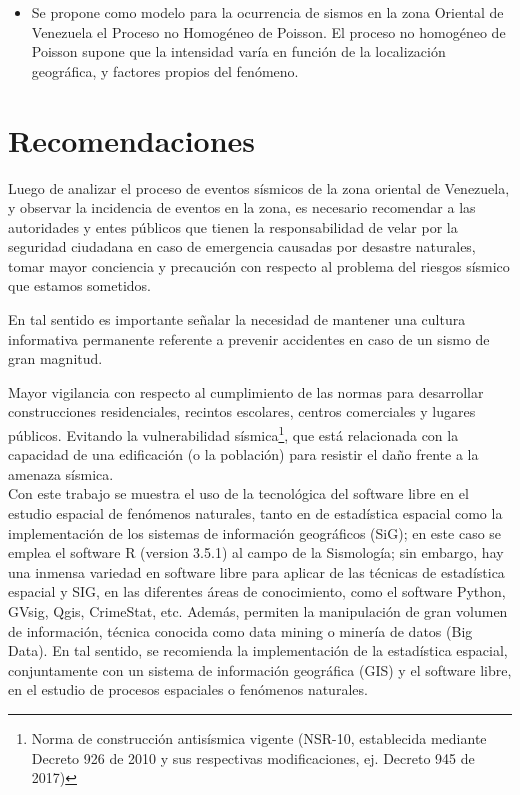 \documentclass[12pt]{report}
\begin{document}
{{{{{{{{{{{{{{{\begin{itemize}
 
 
 \item  Se propone como modelo para la ocurrencia de sismos en la zona Oriental de Venezuela el Proceso no Homogéneo de Poisson. 
  El proceso no homogéneo de Poisson supone que la intensidad varía en función de la localización geográfica, y factores propios del fenómeno. 
  
\end{itemize}

	\section{Recomendaciones }{\label{Recomendacion} }



   Luego de analizar el proceso de eventos sísmicos de la zona oriental de Venezuela, y observar la incidencia de eventos en la zona, es necesario recomendar a las autoridades  y entes públicos que tienen la responsabilidad de velar por la seguridad ciudadana en caso de emergencia causadas por desastre naturales, tomar mayor conciencia y precaución con respecto al problema del riesgos sísmico que estamos sometidos. 
 
   En tal sentido es importante señalar la necesidad de mantener una cultura informativa permanente referente a prevenir accidentes en caso de un sismo de gran magnitud.
 
  Mayor vigilancia  con respecto al  cumplimiento de las normas para desarrollar construcciones residenciales, recintos escolares, centros comerciales y lugares públicos. Evitando la vulnerabilidad sísmica{\footnote{\scriptsize  Norma de construcción antisísmica vigente (NSR-10, establecida mediante Decreto 926 de 2010 y sus respectivas modificaciones, ej. Decreto 945 de 2017)}}, que  está relacionada con la capacidad de una edificación (o la población) para resistir el daño frente a la amenaza sísmica. \\

 	

 
  Con este trabajo se muestra el uso de la tecnológica del software libre en el estudio espacial  de fenómenos naturales, tanto en de estadística espacial como la implementación de los sistemas de información geográficos (SiG); en este caso se emplea el software R (version 3.5.1) al campo de la Sismología; sin embargo, hay una inmensa variedad en software libre para aplicar de las técnicas de estadística  espacial y SIG, en las diferentes áreas de conocimiento,  como el software Python, GVsig, Qgis, CrimeStat, etc.  Además,  permiten la manipulación de gran volumen de información, técnica conocida como data mining  o minería de datos (Big Data). En tal sentido, se recomienda la implementación de la estadística espacial, conjuntamente con un sistema de información geográfica (GIS) y el software libre, en el estudio de procesos espaciales o  fenómenos naturales. \\



}}}}}}}}}}}}}}}
\end{document}
